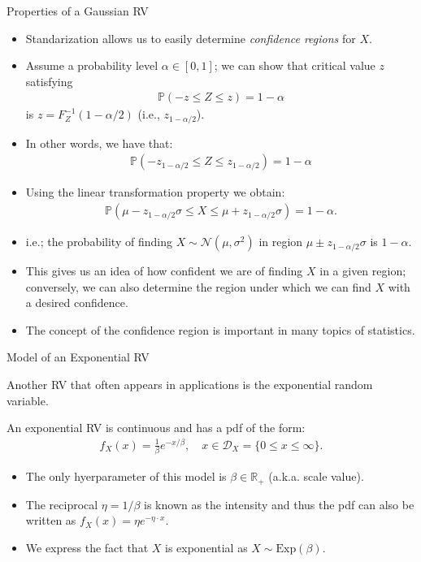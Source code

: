 \documentclass[9pt]{beamer}
\begin{document}
%
\begin{frame}{Properties of a Gaussian RV}

\begin{itemize}
\item Standarization allows us to easily determine {\em confidence regions} for $X$.

\item Assume a probability level $\alpha \in [0,1]$; we can show that critical value $z$ satisfying
\begin{align*}
\mathbb{P}(-z\leq Z\leq z)=1-\alpha
\end{align*}
is $z=F_Z^{-1}(1-\alpha/2)$ (i.e., $z_{1-\alpha/2}$). 
\item In other words, we have that:
\begin{align*}
\mathbb{P}(-z_{1-\alpha/2}\leq Z\leq z_{1-\alpha/2})=1-\alpha
\end{align*} 
\item Using the linear transformation property we obtain:
\begin{align*}
\mathbb{P}(\mu-z_{1-\alpha/2}\sigma\leq X\leq \mu+z_{1-\alpha/2}\sigma)=1-\alpha.
\end{align*}
\item i.e.; the probability of finding $X\sim\mathcal{N}(\mu,\sigma^2)$ in region $\mu\pm z_{1-\alpha/2}\sigma$ is $1-\alpha$. 
\item This gives us an idea of how confident we are of finding $X$ in a given region; conversely, we can also determine the region under which we can find $X$ with a desired confidence. 
\item The concept of the confidence region is important in many topics of statistics. 
\end{itemize}
\end{frame}

%
\begin{frame}{Model of an Exponential RV}

Another RV that often appears in applications is the exponential random variable.  

\begin{block}{}
An exponential RV is continuous and has a pdf of the form:
\begin{align*}
f_X(x)=\frac{1}{\beta}e^{-x/\beta},\quad x\in \mathcal{D}_X=\{0\leq x\leq \infty\}.
\end{align*}
\end{block}
\begin{itemize}
\item The only hyerparameter of this model is $\beta \in \mathbb{R}_+$ (a.k.a. scale value). 
\item The reciprocal $\eta=1/\beta$ is known as the intensity and thus the pdf can also be written as $f_X(x)=\eta e^{-\eta\cdot x}$. 
\item We express the fact that $X$ is exponential as $X\sim \textrm{Exp}(\beta)$.
\end{itemize}

\end{frame}
\end{document}
